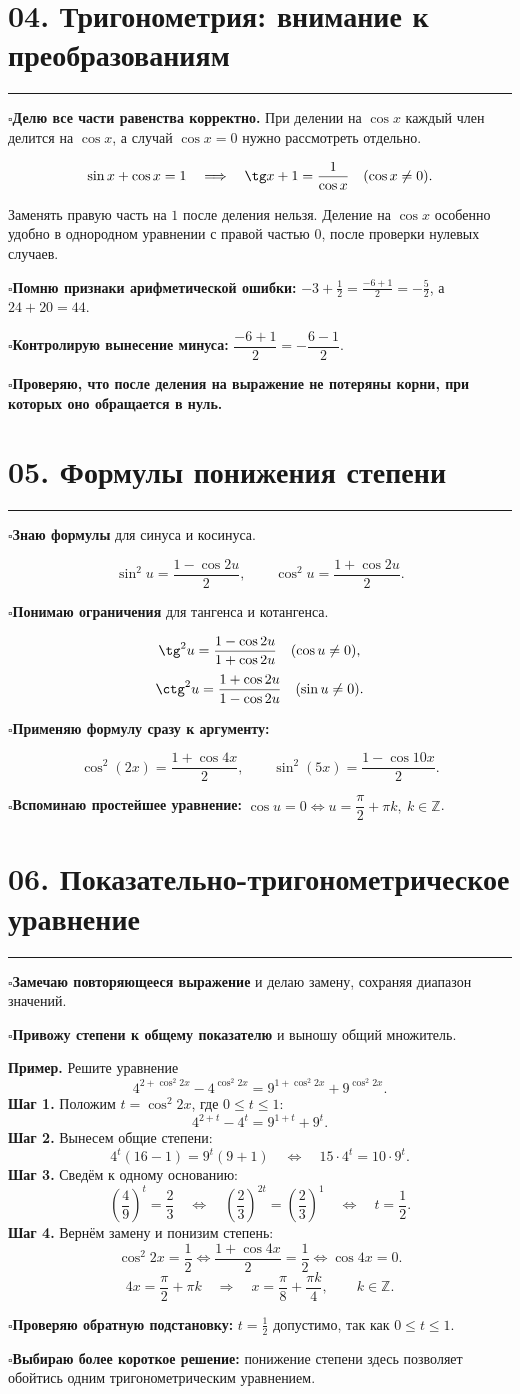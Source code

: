 \documentclass[a4paper,12pt]{article}
\newcommand{\sectionnote}[1]{{\small\color{softgray}#1\par}}
\newcommand{\criterion}[1]{\textcolor{darkaccent}{\bfseries #1}}
\newcommand{\checkitem}[1]{\par\noindent\hspace{-1pt}\textcolor{accent}{\(\square\)}\enspace #1\par}
\newcommand{\lessonsection}[1]{\Needspace{5\baselineskip}\section*{\color{darkaccent}#1}\vspace{-5pt}\noindent\textcolor{accent}{\rule{25mm}{0.7pt}}\par\vspace{1pt}}
\begin{document}
\lessonsection{04. Тригонометрия: внимание к преобразованиям}
\checkitem{\criterion{Делю все части равенства корректно.} При делении на \(\cos x\) каждый член делится на \(\cos x\), а случай \(\cos x=0\) нужно рассмотреть отдельно.}
\[
\sin x+\cos x=1
\quad\Longrightarrow\quad
\tg x+1=\frac1{\cos x}\quad (\cos x\ne0).
\]
\sectionnote{Заменять правую часть на \(1\) после деления нельзя. Деление на \(\cos x\) особенно удобно в однородном уравнении с правой частью \(0\), после проверки нулевых случаев.}

\checkitem{\criterion{Помню признаки арифметической ошибки:} \(-3+\frac12=\frac{-6+1}{2}=-\frac52\), а \(24+20=44\).}
\checkitem{\criterion{Контролирую вынесение минуса:} \(\dfrac{-6+1}{2}=-\dfrac{6-1}{2}\).}
\checkitem{\criterion{Проверяю, что после деления на выражение не потеряны корни, при которых оно обращается в нуль.}}

\lessonsection{05. Формулы понижения степени}
\checkitem{\criterion{Знаю формулы} для синуса и косинуса.}
\[
\boxed{\sin^2u=\frac{1-\cos2u}{2}},\qquad
\boxed{\cos^2u=\frac{1+\cos2u}{2}}.
\]
\checkitem{\criterion{Понимаю ограничения} для тангенса и котангенса.}
\[
\tg^2u=\frac{1-\cos2u}{1+\cos2u}\quad(\cos u\ne0),
\]
\[
\ctg^2u=\frac{1+\cos2u}{1-\cos2u}\quad(\sin u\ne0).
\]
\checkitem{\criterion{Применяю формулу сразу к аргументу:}}
\[\cos^2(2x)=\frac{1+\cos4x}{2},\qquad \sin^2(5x)=\frac{1-\cos10x}{2}.\]
\checkitem{\criterion{Вспоминаю простейшее уравнение:} \(\cos u=0\iff u=\dfrac\pi2+\pi k,\ k\in\mathbb Z\).}

\clearpage
\lessonsection{06. Показательно-тригонометрическое уравнение}
\checkitem{\criterion{Замечаю повторяющееся выражение} и делаю замену, сохраняя диапазон значений.}
\checkitem{\criterion{Привожу степени к общему показателю} и выношу общий множитель.}

\textbf{Пример.} Решите уравнение
\[
4^{2+\cos^2 2x}-4^{\cos^2 2x}
=9^{1+\cos^2 2x}+9^{\cos^2 2x}.
\]
\textbf{Шаг 1.} Положим \(t=\cos^2 2x\), где \(0\le t\le1\):
\[
4^{2+t}-4^t=9^{1+t}+9^t.
\]
\textbf{Шаг 2.} Вынесем общие степени:
\[
4^t(16-1)=9^t(9+1)
\quad\Longleftrightarrow\quad 15\cdot4^t=10\cdot9^t.
\]
\textbf{Шаг 3.} Сведём к одному основанию:
\[
\left(\frac49\right)^t=\frac23
\quad\Longleftrightarrow\quad
\left(\frac23\right)^{2t}=\left(\frac23\right)^1
\quad\Longleftrightarrow\quad t=\frac12.
\]
\textbf{Шаг 4.} Вернём замену и понизим степень:
\[
\cos^2 2x=\frac12
\iff \frac{1+\cos4x}{2}=\frac12
\iff \cos4x=0.
\]
\[
4x=\frac\pi2+\pi k
\quad\Longrightarrow\quad
\boxed{x=\frac\pi8+\frac{\pi k}{4}},\qquad k\in\mathbb Z.
\]
\checkitem{\criterion{Проверяю обратную подстановку:} \(t=\frac12\) допустимо, так как \(0\le t\le1\).}
\checkitem{\criterion{Выбираю более короткое решение:} понижение степени здесь позволяет обойтись одним тригонометрическим уравнением.}
\end{document}
